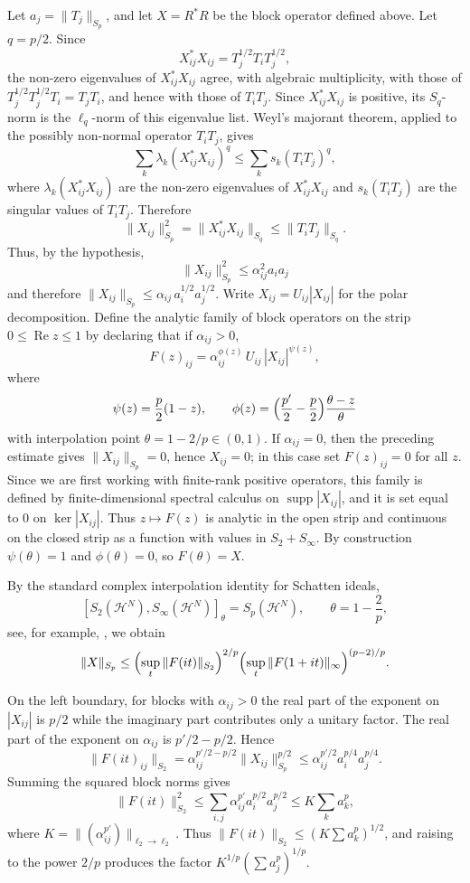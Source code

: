 \documentclass[11pt]{article}
\theoremstyle{definition}
\newcommand{\1}{\mathbf{1}}
\begin{document}
Let $a_j=\|T_j\|_{S_p}$, and let $X=R^*R$ be the block operator defined above.
Let $q=p/2$. Since
\[
X_{ij}^*X_{ij}=T_j^{1/2}T_iT_j^{1/2},
\]
the non-zero eigenvalues of $X_{ij}^*X_{ij}$ agree, with algebraic
multiplicity, with those of $T_j^{1/2}T_j^{1/2}T_i=T_jT_i$, and hence with
those of $T_iT_j$. Since $X_{ij}^*X_{ij}$ is positive, its $S_q$-norm is the
$\ell_q$-norm of this eigenvalue list. Weyl's majorant theorem, applied to the
possibly non-normal operator $T_iT_j$, gives
\[
\sum_k \lambda_k(X_{ij}^*X_{ij})^q
\le
\sum_k s_k(T_iT_j)^q,
\]
where $\lambda_k(X_{ij}^*X_{ij})$ are the non-zero eigenvalues of
$X_{ij}^*X_{ij}$ and $s_k(T_iT_j)$ are the singular values of $T_iT_j$.
Therefore
\[
\|X_{ij}\|_{S_p}^2
=
\|X_{ij}^*X_{ij}\|_{S_q}
\le
\|T_iT_j\|_{S_q}.
\]
Thus, by the hypothesis,
\[
\|X_{ij}\|_{S_p}^2\leq \alpha_{ij}^2 a_i a_j
\]
and therefore $\|X_{ij}\|_{S_p}\leq\alpha_{ij}\,a_i^{1/2}a_j^{1/2}$. Write $X_{ij}=U_{ij}|X_{ij}|$ for the polar decomposition. Define the analytic family of block operators on the strip $0\leq\operatorname{Re}z\leq 1$ by declaring that if $\alpha_{ij}>0$,
\[
F(z)_{ij}=\alpha_{ij}^{\phi(z)}\,U_{ij}\,|X_{ij}|^{\psi(z)},
\]
where
\[
\psi(z)=\frac{p}{2}(1-z),\qquad\phi(z)=\Bigl(\frac{p'}{2}-\frac{p}{2}\Bigr)\frac{\theta-z}{\theta}
\]
with interpolation point $\theta=1-2/p\in(0,1)$. If \(\alpha_{ij}=0\), then the preceding estimate gives
\(\|X_{ij}\|_{S_p}=0\), hence \(X_{ij}=0\); in this case set
\(F(z)_{ij}=0\) for all \(z\). Since we are first working with finite-rank positive operators, this family is
defined by finite-dimensional spectral calculus on $\operatorname{supp}|X_{ij}|$,
and it is set equal to $0$ on $\ker |X_{ij}|$. Thus $z\mapsto F(z)$ is analytic
in the open strip and continuous on the closed strip as a function with values in
$S_2+S_\infty$. By construction $\psi(\theta)=1$ and $\phi(\theta)=0$, so $F(\theta)=X$.

By the standard complex interpolation identity for Schatten ideals,
\[
[S_2(\mathcal H^N),S_\infty(\mathcal H^N)]_\theta
=
S_p(\mathcal H^N),
\qquad \theta=1-\frac2p,
\]
see, for example, \cite{SimonTraceIdeals}, we obtain
\[
\|X\|_{S_p}\leq\Bigl(\sup_t\|F(it)\|_{S_2}\Bigr)^{2/p}\Bigl(\sup_t\|F(1+it)\|_\infty\Bigr)^{(p-2)/p}.
\]

On the left boundary, for blocks with $\alpha_{ij}>0$ the real part of the exponent on $|X_{ij}|$ is $p/2$ while the imaginary part contributes only a unitary factor. The real part of the exponent on $\alpha_{ij}$ is $p'/2-p/2$. Hence
\[
\|F(it)_{ij}\|_{S_2}=\alpha_{ij}^{p'/2-p/2}\|X_{ij}\|_{S_p}^{p/2}\leq\alpha_{ij}^{p'/2}a_i^{p/4}a_j^{p/4}.
\]
Summing the squared block norms gives
\[
\|F(it)\|_{S_2}^2\leq\sum_{i,j}\alpha_{ij}^{p'}a_i^{p/2}a_j^{p/2}\leq K\sum_k a_k^p,
\]
where $K=\|(\alpha_{ij}^{p'})\|_{\ell_2\to\ell_2}$. Thus $\|F(it)\|_{S_2}\leq(K\sum a_k^p)^{1/2}$, and raising to the power $2/p$ produces the factor $K^{1/p}(\sum a_j^p)^{1/p}$.
\end{document}
